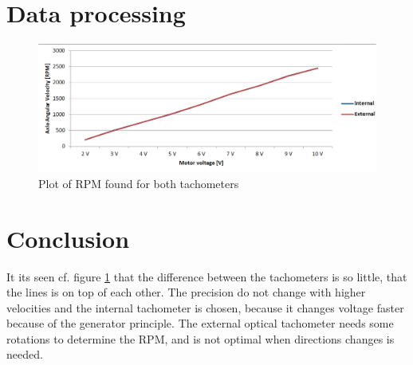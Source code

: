 \section*{Data processing}

\begin{figure}[htbp]
	\centering
	\includegraphics[width=\textwidth]{figures/appendix/Motor&GearTests/RPMTest}
	\caption{Plot of RPM found for both tachometers}\label{fig:RPMTest}
\end{figure}

\section*{Conclusion}
It its seen cf. figure \ref{fig:RPMTest} that the difference between the tachometers is so little, that the lines is on top of each other. The precision do not change with higher velocities and the internal tachometer is chosen, because it changes voltage faster because of the generator principle. The external optical tachometer needs some rotations to determine the RPM, and is not optimal when directions changes is needed.

